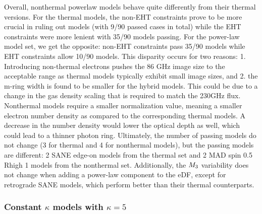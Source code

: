 Overall, \hamr nonthermal powerlaw models behave quite differently from their thermal versions. For the thermal models, the non-EHT constraints prove to be more crucial in ruling out models (with 9/90 passed cases in total) while the EHT constraints were more lenient with 35/90 models passing. For the power-law model set, we get the opposite: non-EHT constraints pass 35/90 models while EHT constraints allow 10/90 models. This disparity occurs for two reasons: 1. Introducing non-thermal electrons pushes the 86 GHz image size to the acceptable range as thermal models typically exhibit small image sizes, and 2. the m-ring width is found to be smaller for the hybrid models. This could be due to a change in the gas density scaling that is required to match the 230GHz flux. Nonthermal models require a smaller normalization value, meaning a smaller electron number density as compared to the corresponding thermal models. A decrease in the number density would lower the optical depth as well, which could lead to a thinner photon ring. Ultimately, the number of passing models do not change (3 for thermal and 4 for nonthermal models), but the passing models are different: 2 SANE edge-on models from the thermal set and 2 MAD spin 0.5 Rhigh 1 models from the nonthermal set. Additionally, the $M_{3}$ variability does not change when adding a power-law component to the eDF, except for retrograde SANE models, which perform better than their thermal counterparts.

\subsubsection{Constant \texorpdfstring{$\kappa$}{kappa} models with \texorpdfstring{$\kappa = 5$}{kappa = 5}}


